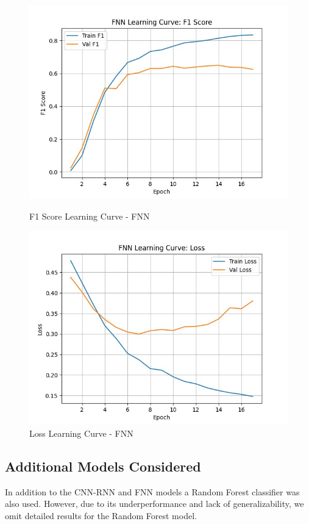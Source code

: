 \begin{figure}[H]
\centering
\begin{minipage}[b]{0.48\textwidth}
    \centering
    \includegraphics[width=\textwidth]{images/Supervised_Results/FNN_learningcurve_F1score.jpg}
    \caption{F1 Score Learning Curve - FNN}
    \label{fig:fnn-f1}
\end{minipage}
\hfill
\begin{minipage}[b]{0.48\textwidth}
    \centering
    \includegraphics[width=\textwidth]{images/Supervised_Results/FNN_learning_curve_loss.jpg}
    \caption{Loss Learning Curve - FNN}
    \label{fig:fnn-loss}
\end{minipage}
\end{figure}

\subsection*{Additional Models Considered}

In addition to the CNN-RNN and FNN models a Random Forest classifier was also used. However, due to its underperformance and lack of generalizability, we omit detailed results for the Random Forest model.